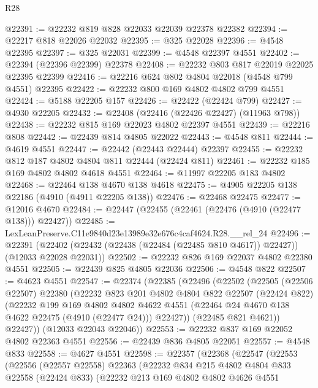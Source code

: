 \begin{lexlean}{R28}
\begin{coremodule}
@22391 := @22232 @819 @828 @22033 @22039 @22378 @22382
@22394 := @22217 @818 @22026 @22032
@22395 := @325 @22028
@22396 := @4548 @22395
@22397 := @325 @22031
@22399 := @4548 @22397 @4551
@22402 := @22394 (@22396 @22399) @22378
@22408 := @22232 @803 @817 @22019 @22025 @22395 @22399
@22416 := @22216 @624 @802 @4804 @22018 (@4548 @799 @4551) @22395
@22422 := @22232 @800 @169 @4802 @4802 @799 @4551
@22424 := @5188 @22205 @157
@22426 := @22422 (@22424 @799)
@22427 := @4930 @22205
@22432 := @22408 (@22416 (@22426 @22427) (@11963 @798))
@22438 := @22232 @815 @169 @22023 @4802 @22397 @4551
@22439 := @22216 @808
@22442 := @22439 @814 @4805 @22022
@22443 := @4548 @811
@22444 := @4619 @4551
@22447 := @22442 (@22443 @22444) @22397
@22455 := @22232 @812 @187 @4802 @4804 @811 @22444 (@22424 @811)
@22461 := @22232 @185 @169 @4802 @4802 @4618 @4551
@22464 := @11997 @22205 @183 @4802
@22468 := @22464 @138 @4670 @138 @4618
@22475 := @4905 @22205 @138 @22186 (@4910 (@4911 @22205 @138))
@22476 := @22468 @22475
@22477 := @12016 @4670
@22484 := @22447 (@22455 (@22461 (@22476 (@4910 (@22477 @138))) @22427))
@22485 := LexLeanPreserve.C11e9840d23e13989e32e676c4caf4624.R28.__rel_24
@22496 := @22391
    (@22402 (@22432 (@22438 (@22484 (@22485 @810 @4617)) @22427)) (@12033 @22028 @22031))
@22502 := @22232 @826 @169 @22037 @4802 @22380 @4551
@22505 := @22439 @825 @4805 @22036
@22506 := @4548 @822
@22507 := @4623 @4551
@22547 := @22374
    (@22385
      (@22496
        (@22502
          (@22505
            (@22506 @22507)
            @22380
            (@22232
              @823
              @201
              @4802
              @4804
              @822
              @22507
              (@22424 @822)
              (@22232
                @199
                @169
                @4802
                @4802
                @4622
                @4551
                (@22464 @24 @4670 @138 @4622 @22475 (@4910 (@22477 @24)))
                @22427))
            (@22485 @821 @4621))
          @22427))
      (@12033 @22043 @22046))
@22553 := @22232 @837 @169 @22052 @4802 @22363 @4551
@22556 := @22439 @836 @4805 @22051
@22557 := @4548 @833
@22558 := @4627 @4551
@22598 := @22357
    (@22368
      (@22547
        (@22553
          (@22556
            (@22557 @22558)
            @22363
            (@22232
              @834
              @215
              @4802
              @4804
              @833
              @22558
              (@22424 @833)
              (@22232
                @213
                @169
                @4802
                @4802
                @4626
                @4551

\end{coremodule}
\end{lexlean}
